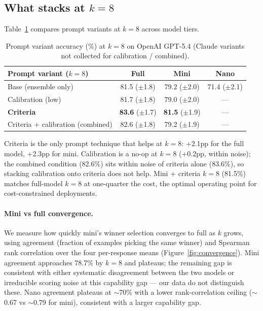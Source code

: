 \documentclass{article}
\begin{document}
\subsection{What stacks at $k{=}8$}
\label{sec:what-works}

Table~\ref{tab:what-works} compares prompt variants at $k{=}8$ across model tiers.

\begin{table}[ht]
\centering
\caption{Prompt variant accuracy (\%) at $k{=}8$ on OpenAI GPT-5.4 (Claude variants not collected for calibration / combined).}
\label{tab:what-works}
\scriptsize
\begin{tabular}{lccc}
\toprule
Prompt variant ($k{=}8$) & Full & Mini & Nano \\
\midrule
Base (ensemble only)              & 81.5 ($\pm$1.8) & 79.2 ($\pm$2.0) & 71.4 ($\pm$2.1) \\
Calibration (low)                 & 81.7 ($\pm$1.8) & 79.0 ($\pm$2.0) & --- \\
\textbf{Criteria}                 & \textbf{83.6} ($\pm$1.7) & \textbf{81.5} ($\pm$1.9) & --- \\
Criteria + calibration (combined) & 82.6 ($\pm$1.8) & 79.2 ($\pm$1.9) & --- \\
\bottomrule
\end{tabular}
\end{table}

Criteria is the only prompt technique that helps at $k{=}8$: +2.1pp for the full model, +2.3pp for mini. Calibration is a no-op at $k{=}8$ (+0.2pp, within noise); the combined condition (82.6\%) sits within noise of criteria alone (83.6\%), so stacking calibration onto criteria does not help. Mini + criteria $k{=}8$ (81.5\%) matches full-model $k{=}8$ at one-quarter the cost, the optimal operating point for cost-constrained deployments.

\paragraph{Mini vs full convergence.} We measure how quickly mini's winner selection converges to full as $k$ grows, using agreement (fraction of examples picking the same winner) and Spearman rank correlation over the four per-response means (Figure~\ref{fig:convergence}). Mini agreement approaches 78.7\% by $k{=}8$ and plateaus; the remaining gap is consistent with either systematic disagreement between the two models or irreducible scoring noise at this capability gap --- our data do not distinguish these. Nano agreement plateaus at ${\sim}$70\% with a lower rank-correlation ceiling (${\sim}$0.67 vs ${\sim}$0.79 for mini), consistent with a larger capability gap.
\end{document}

